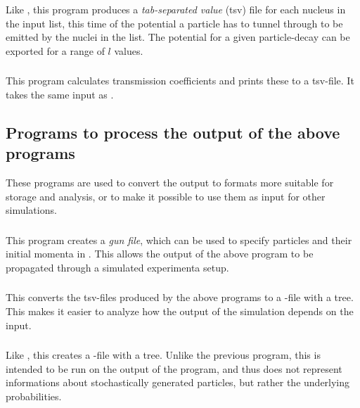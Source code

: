 \subsubsection{}
Like , this program produces a \emph{tab-separated value} (tsv) file for each nucleus in the input list, this time of the potential a particle has to tunnel through to be emitted by the nuclei in the list. The potential for a given particle-decay can be exported for a range of $l$ values.

\subsubsection{}
This program calculates transmission coefficients and prints these to a tsv-file. It takes the same input as .


\subsection{Programs to process the output of the above programs}
These programs are used to convert the output to formats more suitable for storage and analysis, or to make it possible to use them as input for other simulations.
\subsubsection{}
This program creates a  \emph{gun file}, which can be used to specify particles and their initial momenta in . This allows the output of the above program to be propagated through a simulated experimenta setup.

\subsubsection{}
This converts the tsv-files produced by the above programs to a -file with a tree. This makes it easier to analyze how the output of the simulation depends on the input.

\subsubsection{}
Like , this creates a -file with a tree. Unlike the previous program, this is intended to be run on the output of the  program, and thus does not represent informations about stochastically generated particles, but rather the underlying probabilities.

